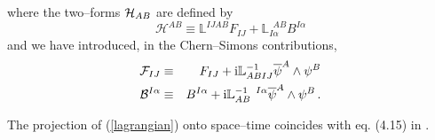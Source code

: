 \documentclass[a4paper,12pt]{article}
\def\bar{\overline}\end {picture}}
\begin{document}
where the two--forms ${\cal H}_{AB}$ are defined by
\begin{equation}
\mathcal{H}^{AB}\equiv\mathbb{L}^{IJAB}{F}_{IJ}+
\mathbb{L}_{I\alpha}^{~~AB}{B}^{I\alpha}
\end{equation}
and we have introduced, in the Chern--Simons contributions,
\begin{eqnarray}
{\cal F}_{IJ} &\equiv & F_{IJ} + {\rm
i}\mathbb{L}^{-1}_{ABIJ}\bar\psi^A \wedge  \psi^B \\
{\cal B}^{I\alpha} & \equiv & {B}^{I\alpha} + {\rm
i}\mathbb{L}^{-1~~I\alpha}_{AB}\bar\psi^A \wedge\psi^B\,.
\end{eqnarray}
\par
The projection of (\ref{lagrangian}) onto space--time coincides
with eq. (4.15) in \cite{gunwar}.
\end{document}
